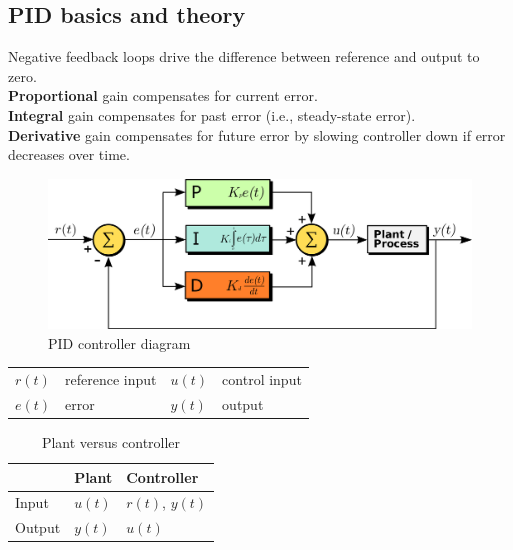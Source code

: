 \documentclass[10pt,conference,compsoc]{IEEEtran}
\begin{document}
\subsection{PID basics and theory}

\noindent Negative feedback loops drive the difference between \gls{reference}
and \gls{output} to zero. \\

\noindent \textbf{Proportional} gain compensates for current \gls{error}. \\
\textbf{Integral} gain compensates for past error (i.e.,
\gls{steady-state error}). \\
\textbf{Derivative} gain compensates for future error by slowing controller down
  if error decreases over time.

\begin{figure}[H]
  \includegraphics[width=\linewidth]{figs/PID_diagram.png}
  \caption{PID controller diagram \cite{bib:PID_diagram}}
  \label{fig:pid_ctrl_diag}
\end{figure}

\begin{table}[ht]
  \renewcommand{\arraystretch}{1.3}
  \centering
  \begin{tabulary}{\linewidth}{LLLL}
    $r(t)$ & \gls{reference} input & $u(t)$ & control input \\
    $e(t)$ & error & $y(t)$ & \gls{output} \\
  \end{tabulary}
  \label{tab:pid_def}
\end{table}

\begin{table}[ht]
  \caption{Plant versus controller}
  \renewcommand{\arraystretch}{1.3}
  \centering
  \begin{tabular}{|l|ll|}
    \hline
    & \textbf{Plant} & \textbf{Controller} \\
    \hline
    Input & $u(t)$ & $r(t)$, $y(t)$ \\
    Output & $y(t)$ & $u(t)$ \\
    \hline
  \end{tabular}
  \label{tab:plant_v_controller}
\end{table}
\end{document}
